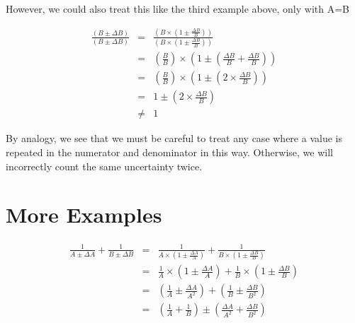 	However, we could also treat this like the third example above, only with A=B
	
	\begin{eqnarray*}
		\frac{\left(B \pm \Delta B\right)}{\left(B \pm \Delta B\right)}&=&\frac{\left(B \times \left(1 \pm \frac{\Delta B}{B}\right)\right)}{\left(B \times \left(1 \pm \frac{\Delta B}{B}\right)\right)}\\&=&\left(\frac{B}{B}\right)\times\left(1 \pm \left(\frac{\Delta B}{B}+\frac{\Delta B}{B}\right)\right)\\&=&\left(\frac{B}{B}\right)\times\left(1 \pm \left(2\times\frac{\Delta B}{B}\right)\right)\\&=&1 \pm \left(2\times\frac{\Delta B}{B}\right)\\&\neq&1
	\end {eqnarray*}
	
	By analogy, we see that we must be careful to treat any case where a value is repeated in the numerator and denominator in this way.  Otherwise, we will incorrectly count the same uncertainty twice.
	
\section{More Examples}	
	\begin{eqnarray*}
		\frac{1}{A \pm \Delta A}+\frac{1}{B\pm\Delta B}&=&\frac{1}{A\times\left(1\pm \frac{\Delta A}{A}\right)}+\frac{1}{B\times \left(1\pm \frac{\Delta B}{B}\right)}\\ &=&\frac{1}{A}\times\left(1\pm \frac{\Delta A}{A}\right)+\frac{1}{B}\times \left(1\pm \frac{\Delta B}{B}\right)\\ &=& \left(\frac{1}{A}\pm \frac{\Delta A}{A^2}\right)+\left(\frac{1}{B}\pm \frac{\Delta B}{B^2}\right)\\ &=&\left(\frac{1}{A}+\frac{1}{B}\right)\pm \left(\frac{\Delta A}{A^2}+\frac{\Delta B}{B^2}\right)\\
	\end{eqnarray*}

	
	
  